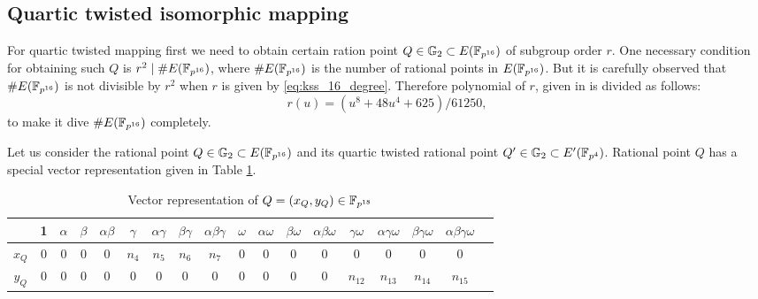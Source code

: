 \subsection{Quartic twisted isomorphic mapping}
For quartic twisted mapping first we need to obtain certain ration point  $Q \in {\mathbb{G}}_{2} \subset E(\mathbb{F}_{p^{16}})$ of subgroup order $r$. 
One necessary condition for obtaining such $Q$ is $r^2 \mid \#E(\mathbb{F}_{p^{16}})$, where $\#E(\mathbb{F}_{p^{16}})$ is the number of rational points in $E(\mathbb{F}_{p^{16}})$.  But it is carefully observed that $\#E(\mathbb{F}_{p^{16}})$ is not divisible by $r^2$ when $r$ is given by \eqref{eq:kss_16_degree}.
 Therefore polynomial of $r$, given in \cite{EPRINT:KacSchSco07} is divided as follows:
\begin{equation}
r(u) =  (u^8 +48u^4 +625)/61250,
\end{equation}
to make it dive  $\#E(\mathbb{F}_{p^{16}})$ completely.

Let us consider the rational point $Q \in {\mathbb{G}}_{2} \subset E(\mathbb{F}_{p^{16}})$ and its quartic twisted rational point $Q' \in {\mathbb{G}}_{2} \subset E'(\mathbb{F}_{p^4})$. Rational point $Q$ has a special vector representation given in  Table \ref{QKSS16}.

\renewcommand{\baselinestretch}{1.5}
\begin{table}[htb] 
	\begin{center}
		\caption{Vector representation of $Q = (x_Q,y_Q) \in \mathbb{F}_{p^{18}}$}
		\begin{tabular}{|c|c|c|c|c|c|c|c|c|c|c|c|c|c|c|c|c|c|}
			\hline 
			   & 1 & $\alpha$ & $\beta$ & $\alpha \beta$ & $\gamma$ & $\alpha \gamma$ & $\beta \gamma$ & $\alpha \beta \gamma$ & $\omega$ & $\alpha \omega$ & $ \beta \omega$ & $\alpha \beta \omega$ & $\gamma \omega$ & $\alpha \gamma \omega$ &$ \beta \gamma \omega$ & $\alpha \beta \gamma \omega$\\ \hline 
			$x_Q$ & 0 & 0 & 0 & 0 & $n_4$ & $n_5$ &$ n_6$ & $n_7$ & 0 & 0 & 0 & 0 & 0 & 0 & 0& 0\\ \hline 
			$y_Q$ & 0 & 0 & 0 & 0 & 0 & 0 & 0 & 0 & 0 & 0 & 0 & 0 & $n_{12}$ & $n_{13}$ & $n_{14}$ & $n_{15}$\\\hline 
		\end{tabular}\label{QKSS16}
	\end{center}
\end{table}
\renewcommand{\baselinestretch}{1.0}

